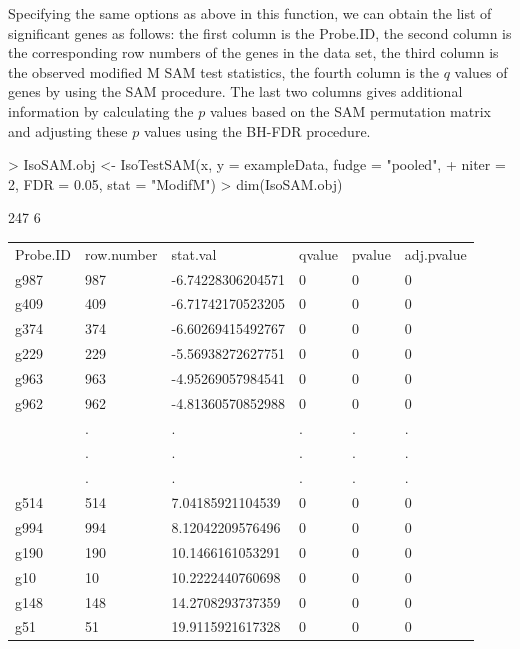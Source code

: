 \documentclass[10pt]{mybook4}
\begin{document}
Specifying the same options as above in this function, we can obtain the list of significant genes as follows: the first column is the Probe.ID, the second column is the corresponding row numbers of the genes in the data set, the third column is the observed modified M SAM test statistics, the fourth column is the $q$ values of genes by using the SAM procedure. The last two columns gives additional information by calculating the $p$ values based on the SAM permutation matrix and adjusting these $p$ values using the BH-FDR procedure.


\begin{Schunk}
\begin{Sinput}
> IsoSAM.obj <- IsoTestSAM(x, y = exampleData, fudge = "pooled", 
+     niter = 2, FDR = 0.05, stat = "ModifM")
> dim(IsoSAM.obj)
\end{Sinput}
\begin{Soutput}
[1] 247   6
\end{Soutput}
\end{Schunk}

\begin{table}[!h]
\begin{left}
\begin{tabular}{llllll}
 Probe.ID & row.number & stat.val & qvalue & pvalue & adj.pvalue \\
 g987 & 987 & -6.74228306204571 & 0 & 0 & 0 \\
  g409 & 409 & -6.71742170523205 & 0 & 0 & 0 \\
  g374 & 374 & -6.60269415492767 & 0 & 0 & 0 \\
  g229 & 229 & -5.56938272627751 & 0 & 0 & 0 \\
  g963 & 963 & -4.95269057984541 & 0 & 0 & 0 \\
  g962 & 962 & -4.81360570852988 & 0 & 0 & 0 \\
   & . & . & . & . & . \\
   & . & . & . & . & . \\
   & . & . & . & . & . \\
  g514 & 514 & 7.04185921104539 & 0 & 0 & 0 \\
  g994 & 994 & 8.12042209576496 & 0 & 0 & 0 \\
  g190 & 190 & 10.1466161053291 & 0 & 0 & 0 \\
  g10 & 10 & 10.2222440760698 & 0 & 0 & 0 \\
  g148 & 148 & 14.2708293737359 & 0 & 0 & 0 \\
  g51 & 51 & 19.9115921617328 & 0 & 0 & 0 \\
  \end{tabular}
\end{left}
\end{table}
\end{document}
